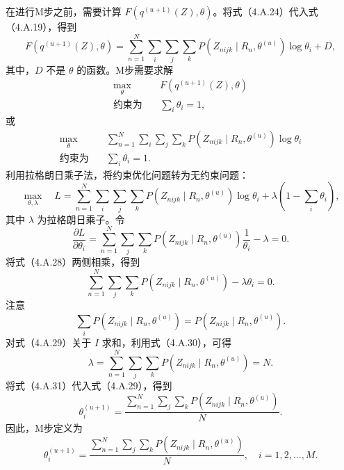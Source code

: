 在进行M步之前，需要计算 $F(q^{(u+1)}(Z),\theta)$。将式（4.A.24）代入式（4.A.19），得到
\begin{equation}
F(q^{(u+1)}(Z),\theta)=\sum_{n=1}^{N}\sum_i\sum_j\sum_k
P(Z_{nijk}\mid R_n,\theta^{(u)})\log\theta_i+D,\tag{4.A.25}
\end{equation}
其中，$D$ 不是 $\theta$ 的函数。M步需要求解
\[
\begin{aligned}
\max_\theta\quad&F(q^{(u+1)}(Z),\theta)\\
\text{约束为}\quad&\sum_i\theta_i=1,
\end{aligned}
\]
或
\begin{equation}
\begin{aligned}
\max_\theta\quad&\sum_{n=1}^{N}\sum_i\sum_j\sum_k
P(Z_{nijk}\mid R_n,\theta^{(u)})\log\theta_i\\
\text{约束为}\quad&\sum_i\theta_i=1.
\end{aligned}\tag{4.A.26}
\end{equation}
利用拉格朗日乘子法，将约束优化问题转为无约束问题：
\begin{equation}
\max_{\theta,\lambda}\quad L=
\sum_{n=1}^{N}\sum_i\sum_j\sum_kP(Z_{nijk}\mid R_n,\theta^{(u)})\log\theta_i
+\lambda\left(1-\sum_i\theta_i\right),\tag{4.A.27}
\end{equation}
其中 $\lambda$ 为拉格朗日乘子。令
\begin{equation}
\frac{\partial L}{\partial\theta_i}
=\sum_{n=1}^{N}\sum_j\sum_kP(Z_{nijk}\mid R_n,\theta^{(u)})\frac1{\theta_i}-\lambda=0.\tag{4.A.28}
\end{equation}
将式（4.A.28）两侧相乘，得到
\begin{equation}
\sum_{n=1}^{N}\sum_j\sum_kP(Z_{nijk}\mid R_n,\theta^{(u)})-\lambda\theta_i=0.\tag{4.A.29}
\end{equation}
注意
\begin{equation}
\sum_iP(Z_{nijk}\mid R_n,\theta^{(u)})
=P(Z_{nijk}\mid R_n,\theta^{(u)}).\tag{4.A.30}
\end{equation}
对式（4.A.29）关于 $I$ 求和，利用式（4.A.30），可得
\begin{equation}
\lambda=\sum_{n=1}^{N}\sum_j\sum_kP(Z_{nijk}\mid R_n,\theta^{(u)})=N.\tag{4.A.31}
\end{equation}
将式（4.A.31）代入式（4.A.29），得到
\begin{equation}
\theta_i^{(u+1)}=\frac{\sum_{n=1}^{N}\sum_j\sum_kP(Z_{nijk}\mid R_n,\theta^{(u)})}{N}.\tag{4.A.32}
\end{equation}
因此，M步定义为
\begin{equation}
\theta_i^{(u+1)}=\frac{\sum_{n=1}^{N}\sum_j\sum_kP(Z_{nijk}\mid R_n,\theta^{(u)})}{N},
\quad i=1,2,\ldots,M.\tag{4.A.33}
\end{equation}
